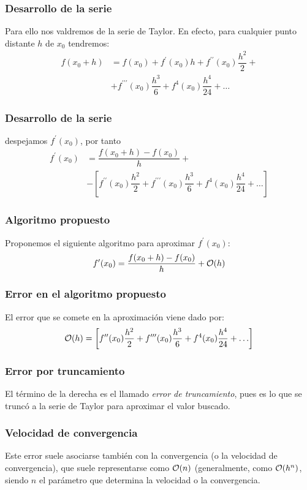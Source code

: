 \begin{frame}
\frametitle{Desarrollo de la serie}
Para ello nos valdremos de la serie de Taylor. En efecto, para cualquier punto distante $h$ de $x_{0}$ tendremos:
\begin{align*}
f(x_{0} + h) &= f(x_{0}) + f^{\prime}(x_{0})h + f^{\prime \prime}(x_{0}) \dfrac{h^{2}}{2} + \\
&+ f^{\prime \prime \prime}(x_{0}) \dfrac{h^{3}}{6} + f^{4}(x_{0}) \dfrac{h^{4}}{24} + \ldots
\end{align*}
\end{frame}
\begin{frame}
\frametitle{Desarrollo de la serie}
despejamos $f^{\prime}(x_{0})$, por tanto
\begin{align*}
f^{\prime}(x_{0}) &= \dfrac{f(x_{0} + h) - f(x_{0})}{h} + \\
&- \left[ f^{\prime \prime}(x_{0}) \dfrac{h^{2}}{2} + f^{\prime \prime \prime}(x_{0}) \dfrac{h^{3}}{6} + f^{4}(x_{0}) \dfrac{h^{4}}{24} + \ldots \right] 
\end{align*}
\end{frame}
\begin{frame}
\frametitle{Algoritmo propuesto}
Proponemos el siguiente algoritmo para aproximar $f^{\prime}(x_{0})$:
\begin{align*}
f^{\prime}(x_{0}) = \dfrac{f(x_{0} + h) - f(x_{0})}{h} + \order{h}
\end{align*}
\end{frame}
\begin{frame}
\frametitle{Error en el algoritmo propuesto}
El error que se comete en la aproximación viene dado por:
\begin{align*}
\order{h} = \left[  f^{\prime \prime}(x_{0}) \dfrac{h^{2}}{2} + f^{\prime \prime \prime}(x_{0}) \dfrac{h^{3}}{6} + f^{4}(x_{0}) \dfrac{h^{4}}{24} + \ldots \right] 
\end{align*}
\end{frame}
\begin{frame}
\frametitle{Error por truncamiento}
El término de la derecha es el llamado \emph{error de truncamiento}, pues es lo que se truncó a la serie de Taylor para aproximar el valor buscado. 
\end{frame}
\begin{frame}
\frametitle{Velocidad de convergencia}
Este error suele asociarse también con la convergencia (o la velocidad de convergencia), que suele representarse como $\order{n}$ (generalmente, como $\order{h^{n}}$, siendo $n$ el parámetro que determina la velocidad o la convergencia. 
\end{frame}
